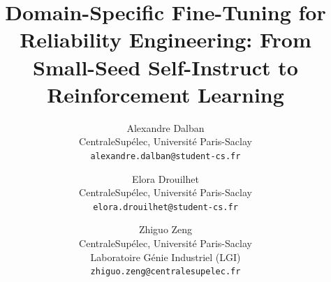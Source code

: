 \documentclass[10pt,twocolumn,letterpaper]{article}
\title{Domain-Specific Fine-Tuning for Reliability Engineering: From Small-Seed Self-Instruct to Reinforcement Learning}
\author{Alexandre Dalban\\
CentraleSup\'{e}lec, Universit\'{e} Paris-Saclay\\
{\tt\small alexandre.dalban@student-cs.fr}
\and
Elora Drouilhet\\
CentraleSup\'{e}lec, Universit\'{e} Paris-Saclay\\
{\tt\small elora.drouilhet@student-cs.fr}
\and
Zhiguo Zeng\\
CentraleSup\'{e}lec, Universit\'{e} Paris-Saclay\\
Laboratoire G\'{e}nie Industriel (LGI)\\
{\tt\small zhiguo.zeng@centralesupelec.fr}
}
\begin{document}
\maketitle










{
    \small
    
    
}


\end{document}
